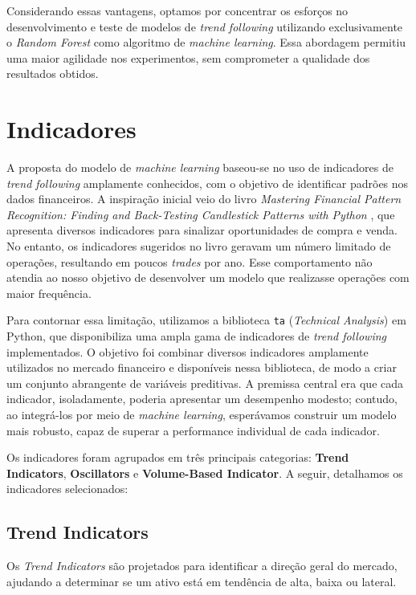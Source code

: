 \documentclass{article}
\begin{document}
Considerando essas vantagens, optamos por concentrar os esforços no desenvolvimento e teste de modelos de \textit{trend following} utilizando exclusivamente o \textit{Random Forest} como algoritmo de \textit{machine learning}. Essa abordagem permitiu uma maior agilidade nos experimentos, sem comprometer a qualidade dos resultados obtidos.

\newpage

\section{Indicadores}
A proposta do modelo de \textit{machine learning} baseou-se no uso de indicadores de \textit{trend following} amplamente conhecidos, com o objetivo de identificar padrões nos dados financeiros. A inspiração inicial veio do livro \textit{Mastering Financial Pattern Recognition: Finding and Back-Testing Candlestick Patterns with Python} \cite{Kaabar}, que apresenta diversos indicadores para sinalizar oportunidades de compra e venda. No entanto, os indicadores sugeridos no livro geravam um número limitado de operações, resultando em poucos \textit{trades} por ano. Esse comportamento não atendia ao nosso objetivo de desenvolver um modelo que realizasse operações com maior frequência.

Para contornar essa limitação, utilizamos a biblioteca \texttt{ta} (\textit{Technical Analysis}) em Python, que disponibiliza uma ampla gama de indicadores de \textit{trend following} implementados. O objetivo foi combinar diversos indicadores amplamente utilizados no mercado financeiro e disponíveis nessa biblioteca, de modo a criar um conjunto abrangente de variáveis preditivas. A premissa central era que cada indicador, isoladamente, poderia apresentar um desempenho modesto; contudo, ao integrá-los por meio de \textit{machine learning}, esperávamos construir um modelo mais robusto, capaz de superar a performance individual de cada indicador. 


Os indicadores foram agrupados em três principais categorias: \textbf{Trend Indicators}, \textbf{Oscillators} e \textbf{Volume-Based Indicator}. A seguir, detalhamos os indicadores selecionados:

\subsection{Trend Indicators}

Os \textit{Trend Indicators} são projetados para identificar a direção geral do mercado, ajudando a determinar se um ativo está em tendência de alta, baixa ou lateral.
\end{document}
